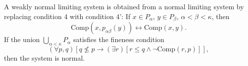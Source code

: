 A weakly normal limiting system is obtained from a normal limiting system by replacing condition 4 with condition 4':
If $x \in P_\alpha$, $y \in P_\beta$, $\alpha < \beta < \kappa$, then
$$\text{Comp}(x, p_{\alpha\beta}(y)) \leftrightarrow \text{Comp}(x, y).$$
If the union $\bigcup_{\alpha < \kappa} P_\alpha$ satisfies the fineness condition
$$(\forall p, q)[q \not\leq p \rightarrow (\exists r)[r \leq q \land \neg \text{Comp}(r, p)]],$$
then the system is normal.
